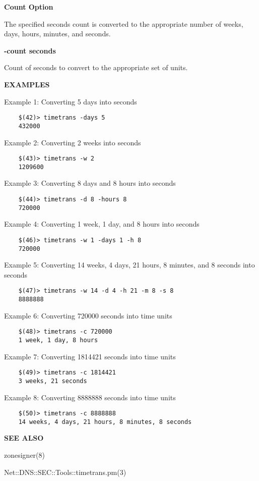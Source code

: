 {\bf Count Option}

The specified seconds count is converted to the appropriate number of weeks,
days, hours, minutes, and seconds.

\begin{description}

\item {\bf -count seconds}\verb" "

Count of seconds to convert to the appropriate set of units.

\end{description}

{\bf EXAMPLES}

Example 1:  Converting 5 days into seconds

\begin{verbatim}
    $(42)> timetrans -days 5
    432000
\end{verbatim}

Example 2:  Converting 2 weeks into seconds

\begin{verbatim}
    $(43)> timetrans -w 2
    1209600
\end{verbatim}

Example 3:  Converting 8 days and 8 hours into seconds

\begin{verbatim}
    $(44)> timetrans -d 8 -hours 8
    720000
\end{verbatim}

Example 4:  Converting 1 week, 1 day, and 8 hours into seconds

\begin{verbatim}
    $(46)> timetrans -w 1 -days 1 -h 8
    720000
\end{verbatim}

Example 5:  Converting 14 weeks, 4 days, 21 hours, 8 minutes, and 8 seconds
into seconds

\begin{verbatim}
    $(47)> timetrans -w 14 -d 4 -h 21 -m 8 -s 8
    8888888
\end{verbatim}

Example 6:  Converting 720000 seconds into time units

\begin{verbatim}
    $(48)> timetrans -c 720000
    1 week, 1 day, 8 hours
\end{verbatim}

Example 7:  Converting 1814421 seconds into time units

\begin{verbatim}
    $(49)> timetrans -c 1814421
    3 weeks, 21 seconds
\end{verbatim}

Example 8:  Converting 8888888 seconds into time units

\begin{verbatim}
    $(50)> timetrans -c 8888888
    14 weeks, 4 days, 21 hours, 8 minutes, 8 seconds
\end{verbatim}

{\bf SEE ALSO}

zonesigner(8)

Net::DNS::SEC::Tools::timetrans.pm(3)

